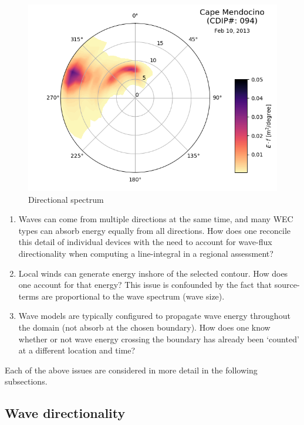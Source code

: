 \begin{figure}[ht]
  \centering
  \includegraphics[width=0.9\linewidth]{../fig/dirspec.png}
  \caption{Directional spectrum}
  \label{fig:dirspec}
\end{figure}

\begin{enumerate}
\item Waves can come from multiple directions at the same time, and many WEC types can absorb energy equally from all directions. How does one reconcile this detail of individual devices with the need to account for wave-flux directionality when computing a line-integral in a regional assessment?
\item Local winds can generate energy inshore of the selected contour. How does one account for that energy? This issue is confounded by the fact that source-terms are proportional to the wave spectrum (wave size).
\item Wave models are typically configured to propagate wave energy throughout the domain (not absorb at the chosen boundary). How does one know whether or not wave energy crossing the boundary has already been ‘counted’ at a different location and time?
\end{enumerate}

Each of the above issues are considered in more detail in the following subsections.

\subsection{Wave directionality}

